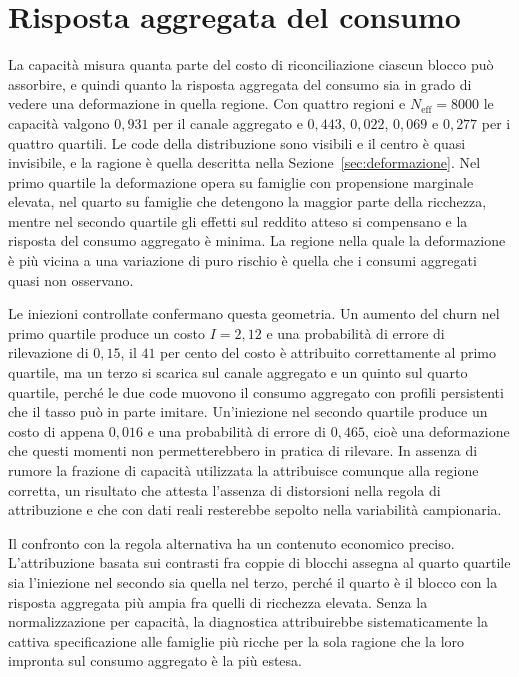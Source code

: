 \documentclass[11pt,a4paper]{article}
\newcommand{\Neff}{N_{\mathrm{eff}}}
\begin{document}
\section{Risposta aggregata del consumo}\label{sec:aggregato}
La capacità misura quanta parte del costo di riconciliazione ciascun blocco può assorbire, e quindi quanto la risposta aggregata del consumo sia in grado di vedere una deformazione in quella regione. Con quattro regioni e $\Neff=8000$ le capacità valgono $0{,}931$ per il canale aggregato e $0{,}443$, $0{,}022$, $0{,}069$ e $0{,}277$ per i quattro quartili. Le code della distribuzione sono visibili e il centro è quasi invisibile, e la ragione è quella descritta nella Sezione~\ref{sec:deformazione}. Nel primo quartile la deformazione opera su famiglie con propensione marginale elevata, nel quarto su famiglie che detengono la maggior parte della ricchezza, mentre nel secondo quartile gli effetti sul reddito atteso si compensano e la risposta del consumo aggregato è minima. La regione nella quale la deformazione è più vicina a una variazione di puro rischio è quella che i consumi aggregati quasi non osservano.

Le iniezioni controllate confermano questa geometria. Un aumento del churn nel primo quartile produce un costo $I=2{,}12$ e una probabilità di errore di rilevazione di $0{,}15$, il $41$ per cento del costo è attribuito correttamente al primo quartile, ma un terzo si scarica sul canale aggregato e un quinto sul quarto quartile, perché le due code muovono il consumo aggregato con profili persistenti che il tasso può in parte imitare. Un'iniezione nel secondo quartile produce un costo di appena $0{,}016$ e una probabilità di errore di $0{,}465$, cioè una deformazione che questi momenti non permetterebbero in pratica di rilevare. In assenza di rumore la frazione di capacità utilizzata la attribuisce comunque alla regione corretta, un risultato che attesta l'assenza di distorsioni nella regola di attribuzione e che con dati reali resterebbe sepolto nella variabilità campionaria.

Il confronto con la regola alternativa ha un contenuto economico preciso. L'attribuzione basata sui contrasti fra coppie di blocchi assegna al quarto quartile sia l'iniezione nel secondo sia quella nel terzo, perché il quarto è il blocco con la risposta aggregata più ampia fra quelli di ricchezza elevata. Senza la normalizzazione per capacità, la diagnostica attribuirebbe sistematicamente la cattiva specificazione alle famiglie più ricche per la sola ragione che la loro impronta sul consumo aggregato è la più estesa.
\end{document}
